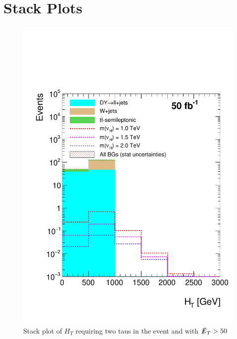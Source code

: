 \section{Stack Plots}

\begin{figure}
\centering
\includegraphics[width=\linewidth]{StackPlots/HT_2taus_met50_50ifb.pdf}
\caption{Stack plot of $H_{T}$ requiring two taus in the event and with $\slashed{E}_{T} > 50$}
\label{fig: HT2tausMet50}
\end{figure}

